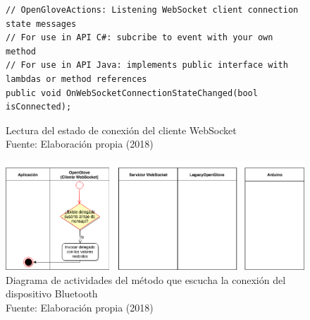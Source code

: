 \begin{figure}[H]
  \begin{center}
\begin{lstlisting}
// OpenGloveActions: Listening WebSocket client connection state messages
// For use in API C#: subcribe to event with your own method
// For use in API Java: implements public interface with lambdas or method references
public void OnWebSocketConnectionStateChanged(bool isConnected);
\end{lstlisting}
   	\captionsetup{justification=centering}
    \caption[Lectura del estado de conexión del cliente WebSocket]{Lectura del estado de conexión del cliente WebSocket\\Fuente: Elaboración propia (2018)}
    \label{fig:methods-6-listening-websocket-state}
  \end{center}
\end{figure}


\begin{figure}[H]
  \begin{center} 
   	\includegraphics[width=1.0\textwidth]{images/chapter04/ActivityDiagrams-ListeningFromWebSocketClient.png} 
   	\captionsetup{justification=centering}
    \caption[Diagrama de actividades del método que escucha la conexión del dispositivo Bluetooth]{Diagrama de actividades del método que escucha la conexión del dispositivo Bluetooth\\Fuente: Elaboración propia (2018)}
    \label{fig:activity-diagrams-6-listening-websocket-state}
  \end{center}
\end{figure}
